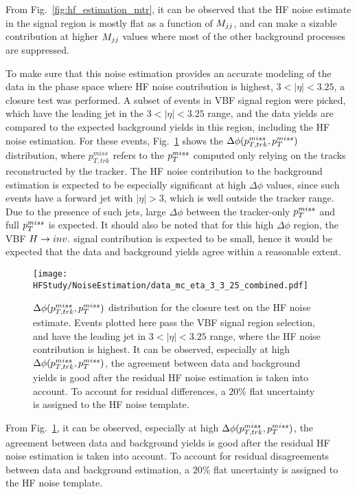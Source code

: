 From Fig.~\ref{fig:hf_estimation_mtr}, it can be observed that the HF noise estimate in the signal region is mostly
flat as a function of $M_{jj}$, and can make a sizable contribution at higher $M_{jj}$ values where most of the other background
processes are suppressed.

To make sure that this noise estimation provides an accurate modeling of the data in the phase space where HF noise contribution is highest,
$3 < |\eta| < 3.25$, a closure test was performed. A subset of events in VBF signal region were picked, which have the leading jet in
the $3 < |\eta| < 3.25$ range, and the data yields are compared to the expected background yields in this region, including the HF noise estimation.
For these events, Fig.~\ref{fig:hf_noise_closure} shows the $\Delta\phi(p_{T,trk}^{miss}, p_T^{miss})$ distribution, where $p_{T,trk}^{miss}$ refers to the
$p_T^{miss}$ computed only relying on the tracks reconstructed by the tracker. The HF noise contribution to the background estimation is expected to be 
especially significant at high $\Delta\phi$ values,
since such events have a forward jet with $|\eta|>3$, which is well outside the tracker range. Due to the presence of such jets, 
large $\Delta\phi$ between the tracker-only $p_T^{miss}$
and full $p_T^{miss}$ is expected. It should also be noted that for this high $\Delta\phi$ region, the VBF $H \rightarrow inv.$ signal contribution is expected to be small,
hence it would be expected that the data and background yields agree within a reasonable extent.

\begin{figure}[h!]
    \centering
    \texttt{[image: HFStudy/NoiseEstimation/data\_mc\_eta\_3\_3\_25\_combined.pdf]}
    \caption{$\Delta\phi(p_{T,trk}^{miss}, p_T^{miss})$ distribution for the closure test on the HF noise estimate. Events plotted here pass the VBF signal 
    region selection, and have the leading jet in $3 < |\eta| < 3.25$ range, where the HF noise contribution is highest.
    It can be observed, especially at high $\Delta\phi(p_{T,trk}^{miss}, p_T^{miss})$, the agreement between data and background yields is good
    after the residual HF noise estimation is taken into account. To account for residual differences, a $20\%$ flat uncertainty is assigned to the HF noise template.}
    \label{fig:hf_noise_closure}
\end{figure}

From Fig.~\ref{fig:hf_noise_closure}, it can be observed, especially at high $\Delta\phi(p_{T,trk}^{miss}, p_T^{miss})$, the agreement between data and background yields is good
after the residual HF noise estimation is taken into account. To account for residual disagreements between data and background estimation, a $20\%$ flat uncertainty
is assigned to the HF noise template. 

